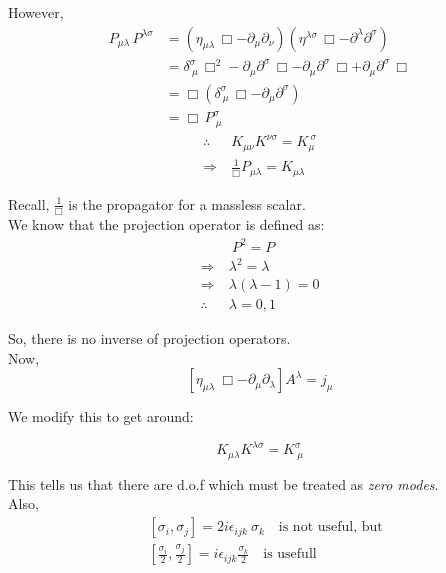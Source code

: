\documentclass[14pt]{article} %
\begin{document}
However,
\begin{align*}
P_{\mu\lambda} \, P^{\lambda\sigma}
&= \left( \eta_{\mu\lambda} \, \Box - \partial_\mu \partial_\nu \right)
\left( \eta^{\lambda\sigma}\, \Box - \partial^\lambda \partial^\sigma \right)
\\
&= 
\delta^\sigma _{\ \mu} \, \Box^2
- \partial_\mu \partial^\sigma \, \Box
- \partial_\mu \partial^\sigma \, \Box
+ \partial_\mu \partial^\sigma \, \Box
\\
&= \Box \left( \delta^\sigma _{\ \mu} \, \Box - \partial_\mu \partial^\sigma \right)
\\
&= \Box \, P^\sigma _{\ \mu}
\end{align*}
\begin{align*}
\therefore~ & K_{\mu\nu} K^{\nu\sigma} = K_\mu^{\ \sigma}
\\
\Rightarrow~ & \frac{1}{\Box} P_{\mu\lambda} = K_{\mu\lambda}
\end{align*}

Recall, \(\frac{1}{\Box}\) is the propagator for a massless scalar. \\

We know that the projection operator is defined as:
\begin{align*}
&~P^2 = P
\\
\Rightarrow~& \lambda^2 = \lambda
\\
\Rightarrow~& \lambda(\lambda - 1) = 0
\\
\therefore~& \lambda = 0, 1
\end{align*}

So, there is no inverse of projection operators.\\

Now,
\[
\left[ \eta_{\mu\lambda} \ \Box - \partial_\mu \partial_\lambda \right] A^\lambda = j_\mu
\]

We modify this to get around:

\[
\boxed{K_{\mu\lambda} K^{\lambda\sigma} = K^\sigma _{\ \mu}}
\]

This tells us that there are d.o.f which must be treated as \textit{zero modes}.\\

Also,
\begin{align*}
&[\sigma_i, \sigma_j] = 2 i \epsilon_{ijk}\  \sigma_k
\quad \text{is not useful, but} 
\\
&\left[ \frac{\sigma_i}{2}, \frac{\sigma_j}{2} \right]
= i \epsilon_{ijk} \frac{\sigma_k}{2} \quad \text{is usefull} 
\end{align*}
\end{document}
